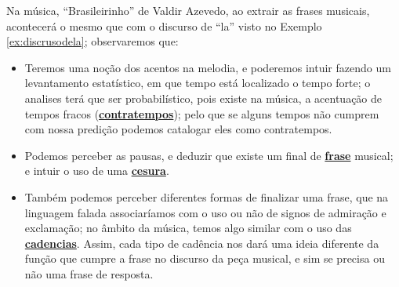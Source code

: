 \begin{example}
Na música, ``Brasileirinho''  de Valdir Azevedo, 
ao extrair as frases musicais, 
acontecerá o mesmo que com o discurso de ``la'' visto no Exemplo \ref{ex:discrusodela};
observaremos que:
\begin{itemize}
\item Teremos uma noção dos acentos na melodia, e poderemos intuir fazendo um levantamento estatístico,
em que tempo está localizado o tempo forte; o analises terá que ser probabilístico,
pois existe na música, a acentuação de tempos fracos (\hyperref[sec:contratempo]{\textbf{contratempos}}); 
pelo que se alguns tempos não cumprem com nossa predição podemos catalogar eles como contratempos.
\item Podemos perceber as pausas, e deduzir que existe um final de \hyperref[sec:Frase]{\textbf{frase}} musical;
e intuir o uso de uma \hyperref[fig:Cesura]{\textbf{cesura}}.
\item Também podemos perceber diferentes formas de finalizar uma frase, 
que na linguagem falada associaríamos com o uso ou não de signos de admiração e exclamação;
no âmbito da música, temos algo similar com o uso das \hyperref[sec:Cadencia]{\textbf{cadencias}}.
Assim, cada tipo de cadência nos dará uma ideia diferente da função que cumpre a frase no discurso da peça musical,
e sim se precisa ou não uma frase de resposta.
\end{itemize}
\end{example}
